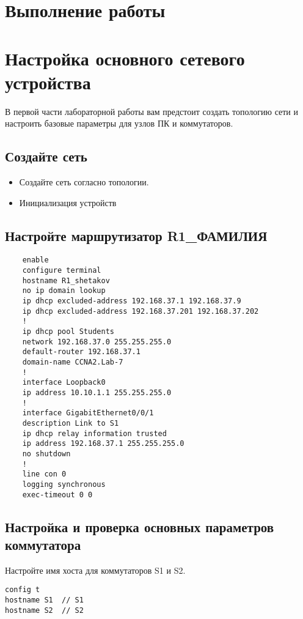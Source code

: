 \section*{\LARGE Выполнение работы}


\section{Настройка основного сетевого устройства}
В первой части лабораторной работы вам предстоит создать топологию сети и настроить базовые
параметры для узлов ПК и коммутаторов.

\subsection{Создайте сеть}
\begin{itemize}
    \item Создайте сеть согласно топологии.
    \item Инициализация устройств
\end{itemize}

\subsection{Настройте маршрутизатор R1\_ФАМИЛИЯ}
\begin{verbatim}
    enable
    configure terminal
    hostname R1_shetakov
    no ip domain lookup
    ip dhcp excluded-address 192.168.37.1 192.168.37.9
    ip dhcp excluded-address 192.168.37.201 192.168.37.202
    !
    ip dhcp pool Students
    network 192.168.37.0 255.255.255.0
    default-router 192.168.37.1
    domain-name CCNA2.Lab-7
    !
    interface Loopback0
    ip address 10.10.1.1 255.255.255.0
    !
    interface GigabitEthernet0/0/1
    description Link to S1
    ip dhcp relay information trusted
    ip address 192.168.37.1 255.255.255.0
    no shutdown
    !
    line con 0
    logging synchronous
    exec-timeout 0 0
\end{verbatim}

\subsection{Настройка и проверка основных параметров коммутатора}
Настройте имя хоста для коммутаторов S1 и S2.

\begin{verbatim}
config t
hostname S1  // S1
hostname S2  // S2
\end{verbatim}

